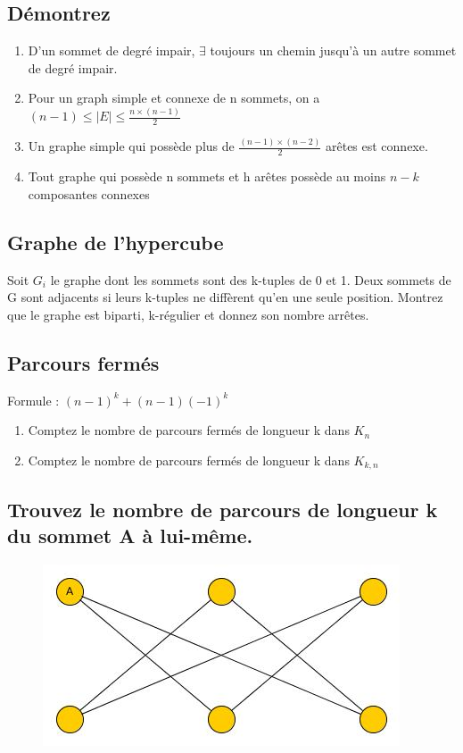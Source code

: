 \subsection{Démontrez}
\begin{enumerate}
\item{D'un sommet de degré impair, $\exists$ toujours un chemin jusqu'à un autre sommet de degré impair.}
\item{Pour un graph simple et connexe de n sommets, on a $(n-1) \leq |E| \leq \frac{n \times (n-1)}{2}$}
\item{Un graphe simple qui possède plus de $\frac{(n-1) \times (n-2)}{2}$ arêtes est connexe.}
\item{Tout graphe qui possède n sommets et h arêtes possède au moins $n-k$ composantes connexes}
\end{enumerate}

\subsection{Graphe de l'hypercube}
Soit $G_{i}$ le graphe dont les sommets sont des k-tuples de 0 et 1. Deux sommets de G sont adjacents si leurs k-tuples ne diffèrent qu'en une seule position. Montrez que le graphe est biparti, k-régulier et donnez son nombre arrêtes.

\subsection{Parcours fermés}
Formule : $(n-1)^{k} + (n-1)(-1)^{k}$
\begin{enumerate}
\item{Comptez le nombre de parcours fermés de longueur k dans $K_{n}$}
\item{Comptez le nombre de parcours fermés de longueur k dans $K_{k,n}$}
\end{enumerate}

\subsection{Trouvez le nombre de parcours de longueur k du sommet A à lui-même.}
\begin{figure}
\center
\includegraphics[scale=0.5]{graph_ape1_ex5}
\end{figure}

